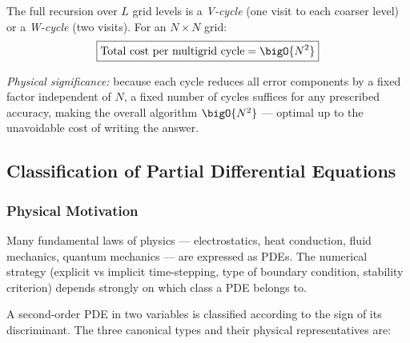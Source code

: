 The full recursion over $L$ grid levels is a \emph{V-cycle} (one visit
to each coarser level) or a \emph{W-cycle} (two visits).  For an
$N\times N$ grid:
\begin{equation}
  \boxed{\text{Total cost per multigrid cycle} = \bigO{N^2}}
  \label{eq:lec08:multigrid-cost}
\end{equation}

\textit{Physical significance:} because each cycle reduces all error
components by a fixed factor independent of $N$, a fixed number of
cycles suffices for any prescribed accuracy, making the overall
algorithm $\bigO{N^2}$ — optimal up to the unavoidable cost of writing
the answer.

\subsection{Classification of Partial Differential Equations}
\label{subsec:lec08:classification}

\subsubsection*{Physical Motivation}
Many fundamental laws of physics — electrostatics, heat conduction,
fluid mechanics, quantum mechanics — are expressed as PDEs.  The
numerical strategy (explicit vs implicit time-stepping, type of
boundary condition, stability criterion) depends strongly on which
class a PDE belongs to.

A second-order PDE in two variables is classified according to the sign
of its discriminant.  The three canonical types and their physical
representatives are:

